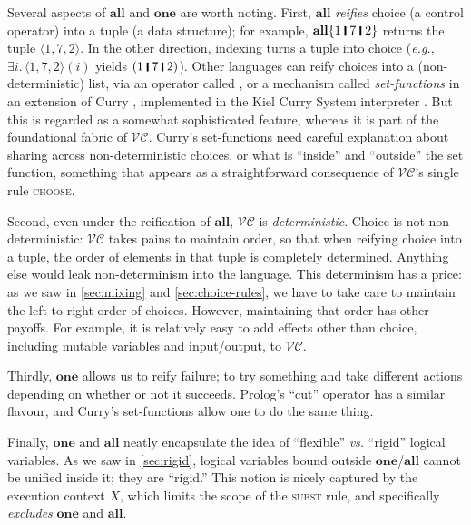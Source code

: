 \documentclass[acmsmall,review,dvipsnames]{acmart}
\newcommand{\Varid}[1]{\mathit{#1}}
\newcommand{\eg}{\emph{e.g.}}
\newcommand{\vs}{\emph{vs.}}
\newcommand{\versecalc}{$\mathcal{VC}$}
\newcommand{\rulename}[1]{\textsc{\small #1}}
\begin{document}
Several aspects of \ensuremath{\textbf{all}} and \ensuremath{\textbf{one}} are worth noting.
First, \ensuremath{\textbf{all}} \emph{reifies} choice (a control operator) into a tuple (a data structure);
for example, \ensuremath{\textbf{all}\{\mathrm{1}\;\rule[-0.3mm]{0.5mm}{2.5mm}\;\mathrm{7}\;\rule[-0.3mm]{0.5mm}{2.5mm}\;\mathrm{2}\}} returns the tuple \ensuremath{\langle{}\mathrm{1},\mathrm{7},\mathrm{2}\rangle}.
In the other direction, indexing turns a tuple into choice ({\eg}, \ensuremath{\exists\Varid{i}.\,\langle{}\mathrm{1},\mathrm{7},\mathrm{2}\rangle(\Varid{i})} yields \ensuremath{(\mathrm{1}\;\rule[-0.3mm]{0.5mm}{2.5mm}\;\mathrm{7}\;\rule[-0.3mm]{0.5mm}{2.5mm}\;\mathrm{2})}).
Other languages can reify choices into a (non-deterministic)
list, via an operator called , or a mechanism called
\emph{set-functions} in an extension of Curry \cite[Section 4.2.7]{curry:tutorial},
implemented in the Kiel Curry System interpreter \cite{brassel:encapsulated,kics,hanus:set-functions}.
But this is regarded as a somewhat sophisticated feature,
whereas it is part of the foundational fabric of \versecalc{}.
Curry's set-functions need careful explanation about sharing across non-deterministic choices,
or what is ``inside'' and ``outside'' the set function, something that appears as a straightforward
consequence of \versecalc{}'s single rule \rulename{choose}.

Second, even under the reification of \ensuremath{\textbf{all}},
\versecalc{} is \emph{deterministic}.  Choice is not
non-deterministic: \versecalc{} takes pains to maintain order, so that
when reifying choice into a tuple, the order of elements in that
tuple is completely determined.  Anything else would leak
non-determinism into the language.  This determinism has a price: as we saw in \cref{sec:mixing}
and \cref{sec:choice-rules}, we have to take care to maintain the
left-to-right order of choices.
However, maintaining that order has other payoffs. For example, it is relatively easy to add
effects other than choice, including mutable variables and input/output, to \versecalc{}.

Thirdly, \ensuremath{\textbf{one}} allows us to reify failure; to try something and take different actions
depending on whether or not it succeeds. Prolog's ``cut'' operator has a similar flavour,
and Curry's set-functions allow one to do the same thing.

Finally, \ensuremath{\textbf{one}} and \ensuremath{\textbf{all}} neatly encapsulate the idea of ``flexible'' {\vs} ``rigid'' logical variables.
As we saw in \cref{sec:rigid}, logical variables bound outside \ensuremath{\textbf{one}}/\ensuremath{\textbf{all}} cannot be unified inside it;
they are ``rigid.''  This notion is nicely captured by the execution context \ensuremath{X}, which limits the
scope of the \rulename{subst} rule, and specifically \emph{excludes} \ensuremath{\textbf{one}} and \ensuremath{\textbf{all}}.
\end{document}
